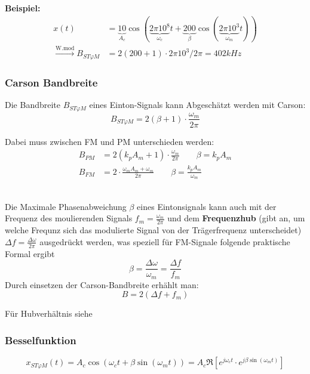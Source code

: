 \textbf{Beispiel:}\\
\begin{align*}
	x(t) &= \underbrace{10}_{A_c}\cos(\underbrace{2\pi10^8}_{\omega_c}t+\underbrace{200}_{\beta}\cos(\underbrace{2\pi10^3}_{\omega_m}t)) \\
	\xrightarrow{\text{W.mod}} B_{ST\varphi M} &= 2(200+1)\cdot 2\pi 10^3 / 2 \pi = 402kHz
\end{align*}


\subsubsection{Carson Bandbreite}
Die Bandbreite $B_{ST\varphi M}$ eines Einton-Signals kann Abgeschätzt werden mit Carson:
\[B_{ST\varphi M} = 2(\beta + 1)\cdot\frac{\omega_m}{2\pi}\]

\noindent Dabei muss zwischen FM und PM unterschieden werden:
\begin{align*}
	B_{PM} &= 2(k_pA_m+1)\cdot\frac{\omega_m}{2\pi} \qquad \beta = k_p A_m \\
	B_{FM} &= 2\cdot\frac{\omega_mA_m + \omega_m}{2\pi} \qquad \beta = \frac{k_p A_m}{\omega_m}
\end{align*}

~\\
Die Maximale Phasenabweichung $\beta$ eines Eintonsignals kann auch mit der Frequenz des moulierenden Signals $f_m = \frac{\omega_m}{2\pi}$ und dem \textbf{Frequenzhub} (gibt an, um welche Frequnz sich das modulierte Signal von der Trägerfrequenz unterscheidet) $\Delta f = \frac{\Delta \omega}{2\pi}$ ausgedrückt werden, was speziell für FM-Signale folgende praktische Formal ergibt
\[\beta = \frac{\Delta\omega}{\omega_m} = \frac{\Delta f}{f_m}\]
Durch einsetzen der Carson-Bandbreite erhählt man:
\[B = 2(\Delta f + f_m)\]

\noindent Für Hubverhältnis siehe 

\subsubsection{Besselfunktion}
\[
x_{ST\varphi M}(t) = A_c \cos(\omega_ct+\beta\sin(\omega_mt)) = A_c \Re[e^{j\omega_ct} \cdot e^{j\beta\sin(\omega_mt)}]
\]



